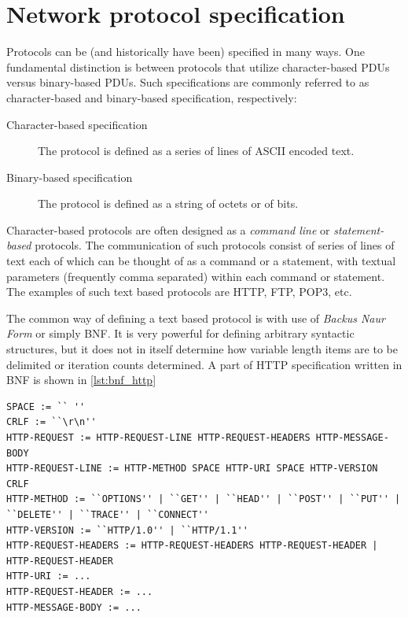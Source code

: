 \documentclass[times, utf8, diplomski]{fer}
\begin{document}
\section{Network protocol specification}
Protocols can be (and historically have been) specified in many ways. One 
fundamental distinction is between protocols that utilize character-based PDUs 
versus binary-based PDUs. Such specifications are commonly referred to as 
character-based and binary-based specification, respectively:
\begin{description}
  \item[Character-based specification] The protocol is defined as a series of 
  lines of ASCII encoded text.
  \item[Binary-based specification] The protocol is defined as a string of 
  octets or of bits.
\end{description}

Character-based protocols are often designed as a \emph{command line} or 
\emph{statement-based} protocols. The communication of such protocols consist of 
series of lines of text each of which can be thought of as a command or a 
statement, with textual parameters (frequently comma separated) within each 
command or statement. The examples of such text based protocols are HTTP, FTP, 
POP3, etc. 

The common way of defining a text based protocol is with use of \emph{Backus Naur Form} 
or simply BNF. It is very powerful for defining arbitrary syntactic structures, 
but it does not in itself determine how variable length items are to be delimited 
or iteration counts determined. A part of HTTP specification written in BNF is 
shown in \ref{lst:bnf_http}

\lstset{language=C++}
\lstset{basicstyle=\tiny}
\lstset{numbers=left, numberstyle=\tiny, stepnumber=1, numbersep=5pt}
\begin{lstlisting}[frame=tb]
SPACE := `` ''
CRLF := ``\r\n''
HTTP-REQUEST := HTTP-REQUEST-LINE HTTP-REQUEST-HEADERS HTTP-MESSAGE-BODY
HTTP-REQUEST-LINE := HTTP-METHOD SPACE HTTP-URI SPACE HTTP-VERSION CRLF
HTTP-METHOD := ``OPTIONS'' | ``GET'' | ``HEAD'' | ``POST'' | ``PUT'' | ``DELETE'' | ``TRACE'' | ``CONNECT''
HTTP-VERSION := ``HTTP/1.0'' | ``HTTP/1.1''
HTTP-REQUEST-HEADERS := HTTP-REQUEST-HEADERS HTTP-REQUEST-HEADER | HTTP-REQUEST-HEADER
HTTP-URI := ...
HTTP-REQUEST-HEADER := ...
HTTP-MESSAGE-BODY := ...
\end{lstlisting}
\end{document}
